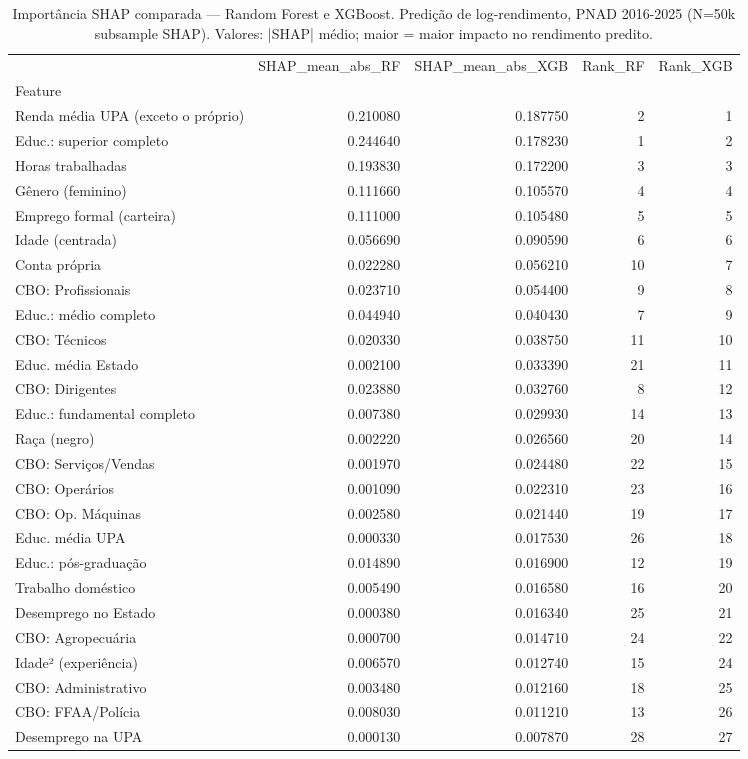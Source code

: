 \begin{table}
\caption{Importância SHAP comparada — Random Forest e XGBoost. Predição de log-rendimento, PNAD 2016-2025 (N=50k subsample SHAP). Valores: |SHAP| médio; maior = maior impacto no rendimento predito.}
\label{tab:shap_importance}
\begin{tabular}{lrrrr}
\toprule
 & SHAP_mean_abs_RF & SHAP_mean_abs_XGB & Rank_RF & Rank_XGB \\
Feature &  &  &  &  \\
\midrule
Renda média UPA (exceto o próprio) & 0.210080 & 0.187750 & 2 & 1 \\
Educ.: superior completo & 0.244640 & 0.178230 & 1 & 2 \\
Horas trabalhadas & 0.193830 & 0.172200 & 3 & 3 \\
Gênero (feminino) & 0.111660 & 0.105570 & 4 & 4 \\
Emprego formal (carteira) & 0.111000 & 0.105480 & 5 & 5 \\
Idade (centrada) & 0.056690 & 0.090590 & 6 & 6 \\
Conta própria & 0.022280 & 0.056210 & 10 & 7 \\
CBO: Profissionais & 0.023710 & 0.054400 & 9 & 8 \\
Educ.: médio completo & 0.044940 & 0.040430 & 7 & 9 \\
CBO: Técnicos & 0.020330 & 0.038750 & 11 & 10 \\
Educ. média Estado & 0.002100 & 0.033390 & 21 & 11 \\
CBO: Dirigentes & 0.023880 & 0.032760 & 8 & 12 \\
Educ.: fundamental completo & 0.007380 & 0.029930 & 14 & 13 \\
Raça (negro) & 0.002220 & 0.026560 & 20 & 14 \\
CBO: Serviços/Vendas & 0.001970 & 0.024480 & 22 & 15 \\
CBO: Operários & 0.001090 & 0.022310 & 23 & 16 \\
CBO: Op. Máquinas & 0.002580 & 0.021440 & 19 & 17 \\
Educ. média UPA & 0.000330 & 0.017530 & 26 & 18 \\
Educ.: pós-graduação & 0.014890 & 0.016900 & 12 & 19 \\
Trabalho doméstico & 0.005490 & 0.016580 & 16 & 20 \\
Desemprego no Estado & 0.000380 & 0.016340 & 25 & 21 \\
CBO: Agropecuária & 0.000700 & 0.014710 & 24 & 22 \\
Idade² (experiência) & 0.006570 & 0.012740 & 15 & 24 \\
CBO: Administrativo & 0.003480 & 0.012160 & 18 & 25 \\
CBO: FFAA/Polícia & 0.008030 & 0.011210 & 13 & 26 \\
Desemprego na UPA & 0.000130 & 0.007870 & 28 & 27 \\
\bottomrule
\end{tabular}
\end{table}
